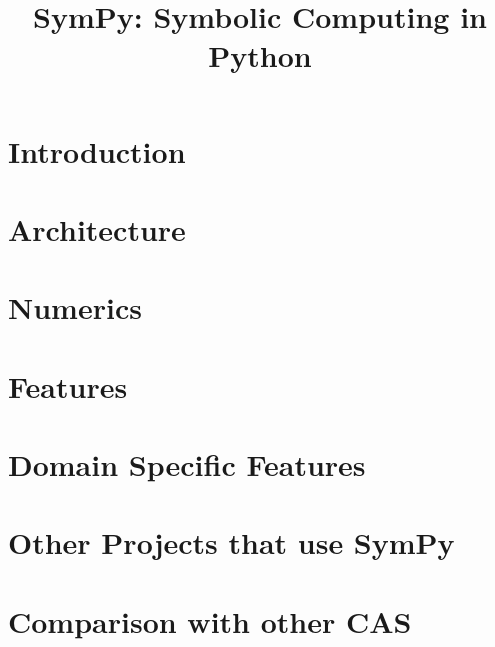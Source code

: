 \documentclass[review]{siamart0216}
\title{SymPy: Symbolic Computing in Python}
\begin{document}
\maketitle

\section{Introduction}




\section{Architecture}



\section{Numerics}




\section{Features}




\section{Domain Specific Features}



\section{Other Projects that use SymPy}



\section{Comparison with other CAS}
\end{document}

